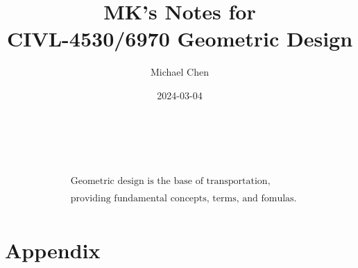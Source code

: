 \documentclass{article}
\title{MK's Notes for \\ CIVL-4530/6970 Geometric Design}
\date{2024-03-04}
\author{Michael Chen}
\begin{document}
  \maketitle

  \begin{align*}
  \\
  \\
  \\
  \\
  \\
  \\
  \\
  \\
  & \text{Geometric design is the base of transportation,}\\ 
  \\
  & \text{providing fundamental concepts, terms, and fomulas.}\\
  \end{align*}
  \newpage

  \tableofcontents
  \newpage


  
  \newpage
  
  \newpage
  
  \newpage
  
  \newpage

  
  \newpage

  \section{Appendix}
\end{document}
